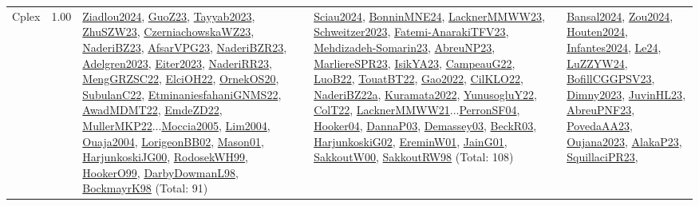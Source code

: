 {\begin{longtable}{p{3cm}r>{\raggedright\arraybackslash}p{6cm}>{\raggedright\arraybackslash}p{6cm}>{\raggedright\arraybackslash}p{8cm}}
\index{Cplex}\index{CPSystems!Cplex}Cplex &  1.00 & \hyperref[detail:Ziadlou2024]{Ziadlou2024}, \hyperref[detail:GuoZ23]{GuoZ23}, \hyperref[detail:Tayyab2023]{Tayyab2023}, \hyperref[detail:ZhuSZW23]{ZhuSZW23}, \hyperref[detail:CzerniachowskaWZ23]{CzerniachowskaWZ23}, \hyperref[detail:NaderiBZ23]{NaderiBZ23}, \hyperref[detail:AfsarVPG23]{AfsarVPG23}, \hyperref[detail:NaderiBZR23]{NaderiBZR23}, \hyperref[detail:Adelgren2023]{Adelgren2023}, \hyperref[detail:Eiter2023]{Eiter2023}, \hyperref[detail:NaderiRR23]{NaderiRR23}, \hyperref[detail:MengGRZSC22]{MengGRZSC22}, \hyperref[detail:ElciOH22]{ElciOH22}, \hyperref[detail:OrnekOS20]{OrnekOS20}, \hyperref[detail:SubulanC22]{SubulanC22}, \hyperref[detail:EtminaniesfahaniGNMS22]{EtminaniesfahaniGNMS22}, \hyperref[detail:AwadMDMT22]{AwadMDMT22}, \hyperref[detail:EmdeZD22]{EmdeZD22}, \hyperref[detail:MullerMKP22]{MullerMKP22}...\hyperref[detail:Moccia2005]{Moccia2005}, \hyperref[detail:Lim2004]{Lim2004}, \hyperref[detail:Ouaja2004]{Ouaja2004}, \hyperref[detail:LorigeonBB02]{LorigeonBB02}, \hyperref[detail:Mason01]{Mason01}, \hyperref[detail:HarjunkoskiJG00]{HarjunkoskiJG00}, \hyperref[detail:RodosekWH99]{RodosekWH99}, \hyperref[detail:HookerO99]{HookerO99}, \hyperref[detail:DarbyDowmanL98]{DarbyDowmanL98}, \hyperref[detail:BockmayrK98]{BockmayrK98} (Total: 91) & \hyperref[detail:Sciau2024]{Sciau2024}, \hyperref[detail:BonninMNE24]{BonninMNE24}, \hyperref[detail:LacknerMMWW23]{LacknerMMWW23}, \hyperref[detail:Schweitzer2023]{Schweitzer2023}, \hyperref[detail:Fatemi-AnarakiTFV23]{Fatemi-AnarakiTFV23}, \hyperref[detail:Mehdizadeh-Somarin23]{Mehdizadeh-Somarin23}, \hyperref[detail:AbreuNP23]{AbreuNP23}, \hyperref[detail:MarliereSPR23]{MarliereSPR23}, \hyperref[detail:IsikYA23]{IsikYA23}, \hyperref[detail:CampeauG22]{CampeauG22}, \hyperref[detail:LuoB22]{LuoB22}, \hyperref[detail:TouatBT22]{TouatBT22}, \hyperref[detail:Gao2022]{Gao2022}, \hyperref[detail:CilKLO22]{CilKLO22}, \hyperref[detail:NaderiBZ22a]{NaderiBZ22a}, \hyperref[detail:Kuramata2022]{Kuramata2022}, \hyperref[detail:YunusogluY22]{YunusogluY22}, \hyperref[detail:ColT22]{ColT22}, \hyperref[detail:LacknerMMWW21]{LacknerMMWW21}...\hyperref[detail:PerronSF04]{PerronSF04}, \hyperref[detail:Hooker04]{Hooker04}, \hyperref[detail:DannaP03]{DannaP03}, \hyperref[detail:Demassey03]{Demassey03}, \hyperref[detail:BeckR03]{BeckR03}, \hyperref[detail:HarjunkoskiG02]{HarjunkoskiG02}, \hyperref[detail:EreminW01]{EreminW01}, \hyperref[detail:JainG01]{JainG01}, \hyperref[detail:SakkoutW00]{SakkoutW00}, \hyperref[detail:SakkoutRW98]{SakkoutRW98} (Total: 108) & \hyperref[detail:Bansal2024]{Bansal2024}, \hyperref[detail:Zou2024]{Zou2024}, \hyperref[detail:Houten2024]{Houten2024}, \hyperref[detail:Infantes2024]{Infantes2024}, \hyperref[detail:Le24]{Le24}, \hyperref[detail:LuZZYW24]{LuZZYW24}, \hyperref[detail:BofillCGGPSV23]{BofillCGGPSV23}, \hyperref[detail:Dimny2023]{Dimny2023}, \hyperref[detail:JuvinHL23]{JuvinHL23}, \hyperref[detail:AbreuPNF23]{AbreuPNF23}, \hyperref[detail:PovedaAA23]{PovedaAA23}, \hyperref[detail:Oujana2023]{Oujana2023}, \hyperref[detail:AlakaP23]{AlakaP23}, \hyperref[detail:SquillaciPR23]{SquillaciPR23}, 
\end{longtable}}
